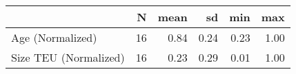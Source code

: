 
\begin{tabular}[t]{lrrrrr}
\toprule
  & N & mean & sd & min & max\\
\midrule
Age (Normalized) & 16 & 0.84 & 0.24 & 0.23 & 1.00\\
Size TEU (Normalized) & 16 & 0.23 & 0.29 & 0.01 & 1.00\\
\bottomrule
\end{tabular}
